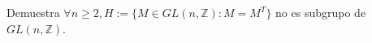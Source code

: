 \question
Demuestra $\forall {n \ge 2},H:=\{M\in GL(n,\mathbb{Z}):M=M^T\}$ 
no es subgrupo de $GL(n,\mathbb{Z})$.